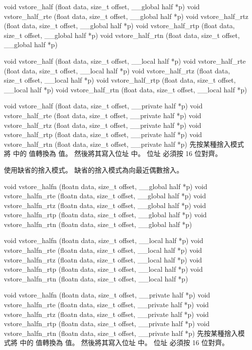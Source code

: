 void vstore_half (float data,
	size_t offset,
	__global half *p)
void vstore_half_rte (float data,
	size_t offset,
	__global half *p)
void vstore_half_rtz (float data,
	size_t offset,
	__global half *p)
void vstore_half_rtp (float data,
	size_t offset,
	__global half *p)
void vstore_half_rtn (float data,
	size_t offset,
	__global half *p)

void vstore_half (float data,
	size_t offset,
	__local half *p)
void vstore_half_rte (float data,
	size_t offset,
	__local half *p)
void vstore_half_rtz (float data,
	size_t offset,
	__local half *p)
void vstore_half_rtp (float data,
	size_t offset,
	__local half *p)
void vstore_half_rtn (float data,
	size_t offset,
	__local half *p)

void vstore_half (float data,
	size_t offset,
	__private half *p)
void vstore_half_rte (float data,
	size_t offset,
	__private half *p)
void vstore_half_rtz (float data,
	size_t offset,
	__private half *p)
void vstore_half_rtp (float data,
	size_t offset,
	__private half *p)
void vstore_half_rtn (float data,
	size_t offset,
	__private half *p)
\stopbuffer
{}
先按某種捨入模式將  中的  值轉換為  值。
然後將其寫入位址  中。
位址  必須按 16 位對齊。

 使用缺省的捨入模式。
缺省的捨入模式為向最近偶數捨入。
\stopbuffer

void vstore_halfn (floatn data,
	size_t offset,
	__global half *p)
void vstore_halfn_rte (floatn data,
	size_t offset,
	__global half *p)
void vstore_halfn_rtz (floatn data,
	size_t offset,
	__global half *p)
void vstore_halfn_rtp (floatn data,
	size_t offset,
	__global half *p)
void vstore_halfn_rtn (floatn data,
	size_t offset,
	__global half *p)

void vstore_halfn (floatn data,
	size_t offset,
	__local half *p)
void vstore_halfn_rte (floatn data,
	size_t offset,
	__local half *p)
void vstore_halfn_rtz (floatn data,
	size_t offset,
	__local half *p)
void vstore_halfn_rtp (floatn data,
	size_t offset,
	__local half *p)
void vstore_halfn_rtn (floatn data,
	size_t offset,
	__local half *p)

void vstore_halfn (floatn data,
	size_t offset,
	__private half *p)
void vstore_halfn_rte (floatn data,
	size_t offset,
	__private half *p)
void vstore_halfn_rtz (floatn data,
	size_t offset,
	__private half *p)
void vstore_halfn_rtp (floatn data,
	size_t offset,
	__private half *p)
void vstore_halfn_rtn (floatn data,
	size_t offset,
	__private half *p)
\stopbuffer
{}
先按某種捨入模式將  中的  值轉換為  值。
然後將其寫入位址  中。
位址  必須按 16 位對齊。

